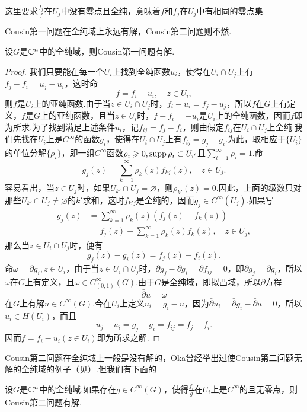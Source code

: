 这里要求$\frac{f_j}{f}$在$U_j$中没有零点且全纯，意味着$f$和$f_j$在$U_j$中有相同的零点集.

Cousin第一问题在全纯域上永远有解，Cousin第二问题则不然.
\begin{theorem}\label{thm6.6.1}
	设$G$是$\mathbb C^n$中的全纯域，则Cousin第一问题有解.
\end{theorem}
\begin{proof}
	我们只要能在每一个$U_i$上找到全纯函数$u_i$，使得在$U_i\cap U_j$上有$f_j-f_i=u_j-u_i$，这时命
	\[f=f_i-u_i,\quad z\in U_i,\]
	则$f$是$U_i$上的亚纯函数.由于当$z\in U_i\cap U_j$时，$f_i-u_i=f_j-u_j$，所以$f$在$G$上有定义，$f$是$G$上的亚纯函数，且当$z\in U_i$时，$f-f_i=-u_i$是$U_i$上的全纯函数，因而$f$即为所求.为了找到满足上述条件$u_i$，记$f_{ij}=f_j-f_i$，则由假定$f_{ij}$在$U_i\cap U_j$上全纯.我们先找在$U_i$上是$C^\infty$的函数$g_i$，使得在$U_i\cap U_j$上有$f_{ij}=g_j-g_i$.为此，取相应于$\{U_i\}$的单位分解$\{\rho_i\}$，即一组$C^\infty$函数$\rho_i\geqslant0,\operatorname{supp}\rho_i\subset U_{i'}$且$\sum_{i=1}^{\infty}\rho_i=1$.命
	\[g_j(z)=\sum_{k=1}^{\infty}\rho_k(z)f_{kj}(z),\quad z\in U_j.\]
	容易看出，当$z\in U_j$时，如果$U_{k'}\cap U_j=\varnothing$，则$\rho_{k'}(z)=0$.因此，上面的级数只对那些$U_{k'}\cap U_j\neq\varnothing$的$k'$求和，这时$f_{k' j}$是全纯的，因而$g_j\in C^\infty(U_j)$.如果写
	\begin{align*}
		g_j(z)
		&=\sum_{k=1}^{\infty}\rho_k(z)(f_j(z)-f_k(z))\\
		&=f_j(z)-\sum_{k=1}^{\infty}\rho_k(z)f_k(z),\quad z\in U_j,
	\end{align*}
	那么当$z\in U_i\cap U_j$时，便有
	\[g_j(z)-g_i(z)=f_j(z)-f_i(z).\]
	命$\omega=\bar{\partial}g_i,z\in U_i$，由于当$z\in U_i\cap U_j$时，$\bar{\partial}g_j-\bar{\partial}g_i=\bar{\partial}f_{ij}=0$，即$\bar{\partial}g_j=\bar{\partial}g_i$，所以$\omega$在$G$上有定义，且$\omega\in C_{(0,1)}^\infty(G)$.由于$G$是全纯域，即拟凸域，所以$\bar{\partial}$方程
	\[\bar{\partial}u=\omega\]
	在$G$上有解$u\in C^\infty(G)$.今在$U_i$上定义$u_i=g_i-u$，因为$\bar{\partial} u_i=\bar{\partial} g_i-\bar{\partial}u=0$，所以$u_i\in H(U_i)$，而且
	\[u_j-u_i=g_j-g_i=f_{ij}=f_j-f_i.\]
	因而$f=f_i-u_i(z\in U_i)$即为所求之解.
\end{proof}
Cousin第二问题在全纯域上一般是没有解的，Oka曾经举出过使Cousin第二问题无解的全纯域的例子（见\cite[p.250]{krantz2001function}）.但我们有下面的
\begin{theorem}\label{thm6.6.2}
	设$G$是$\mathbb C^n$中的全纯域.如果存在$g\in C^\infty(G)$，使得$\frac{f_i}{g}$在$U_i$上是$C^\infty$的且无零点，则Cousin第二问题有解.
\end{theorem}
